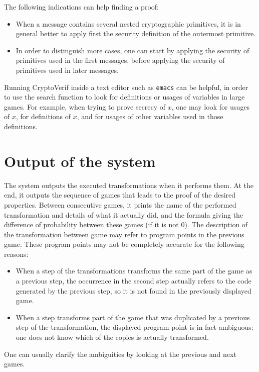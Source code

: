 \documentclass{article}
\begin{document}
The following indications can help finding a proof:
\begin{itemize}

\item When a message contains several nested cryptographic primitives,
it is in general better to apply first the security definition of the
outermost primitive.

\item In order to distinguish more cases, one can start by applying
the security of primitives used in the first messages, before applying
the security of primitives used in later messages.

\end{itemize}
Running CryptoVerif inside a text editor such as \texttt{emacs} can be
helpful, in order to use the search function to look for definitions
or usages of variables in large games.  For example, when trying to
prove secrecy of $x$, one may look for usages of $x$, for
definitions of $x$, and for usages of other variables used in those
definitions.

\section{Output of the system}

The system outputs the executed transformations when it performs
them. At the end, it outputs the sequence of games that leads to the
proof of the desired properties. Between consecutive games, it prints
the name of the performed transformation and details of what it
actually did, and the formula giving the difference of probability
between these games (if it is not 0).
The description of the transformation between game may refer to 
program points in the previous game. These program points may not be
completely accurate for the following reasons:
\begin{itemize}
\item When a step of the transformations transforms the same part of 
the game as a previous step, the occurrence in the second step actually
refers to the code generated by the previous step, so it is not found
in the previously displayed game.
\item When a step transforms part of the game that was duplicated by
a previous step of the transformation, the displayed program point
is in fact ambiguous: one does not know which of the copies is actually
transformed.
\end{itemize}
One can usually clarify the ambiguities by looking at the previous and
next games. 
\end{document}
